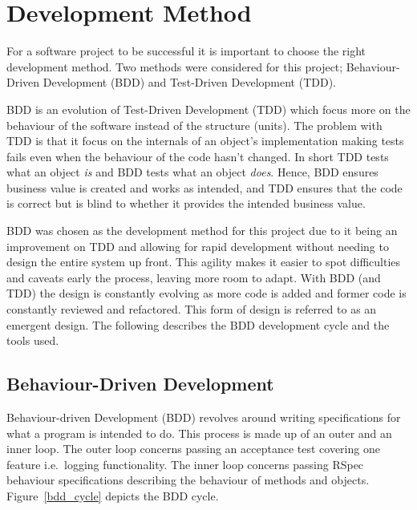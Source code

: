\section{Development Method} %
\label{sec:development}

For a software project to be successful it is important to choose the right
development method. Two methods were considered for this project;
Behaviour-Driven Development (BDD) and Test-Driven Development (TDD).

BDD is an evolution of Test-Driven Development (TDD) which focus more on the
behaviour of the software instead of the structure (units). The problem with
TDD is that it focus on the internals of an object's implementation making
tests fails even when the behaviour of the code hasn't changed. In short TDD
tests what an object \textit{is} and BDD tests what an object
\textit{does}\cite{rspecbook}. Hence, BDD ensures business value is created and
works as intended, and TDD ensures that the code is correct but is blind to
whether it provides the intended business value.

BDD was chosen as the development method for this project due to it being an
improvement on TDD and allowing for rapid development without needing to
design the entire system up front. This agility makes it easier to spot
difficulties and caveats early the process, leaving more room to adapt. With
BDD (and TDD) the design is constantly evolving as more code is added and
former code is constantly reviewed and refactored. This form of design is
referred to as an emergent design. The following describes the BDD development
cycle and the tools used.

\subsection{Behaviour-Driven Development}
Behaviour-driven Development (BDD) revolves around writing specifications for
what a program is intended to do. This process is made up of an outer and an
inner loop. The outer loop concerns passing an acceptance test covering one
feature i.e.\ logging functionality. The inner loop concerns passing RSpec
behaviour specifications describing the behaviour of methods and objects.
Figure~\ref{bdd_cycle} depicts the BDD cycle.

